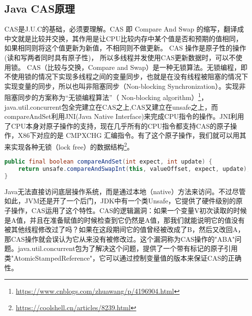 \documentclass[../../../interview-questions.tex]{subfiles}
\begin{document}
\subsection{Java CAS原理}

CAS是J.U.C的基础，必须要理解。CAS 即 Compare And Swap 的缩写，翻译成中文就是比较并交换，其作用是让CPU比较内存中某个值是否和预期的值相同，如果相同则将这个值更新为新值，不相同则不做更新。 CAS 操作是原子性的操作(读和写两者同时具有原子性)， 所以多线程并发使用CAS更新数据时，可以不使用锁。
CAS（比较与交换，Compare and Swap）是一种无锁算法。无锁编程，即不使用锁的情况下实现多线程之间的变量同步，也就是在没有线程被阻塞的情况下实现变量的同步，所以也叫非阻塞同步（Non-blocking Synchronization）。实现非阻塞同步的方案称为“无锁编程算法”（ Non-blocking algorithm）\footnote{\url{https://www.cnblogs.com/zhuawang/p/4196904.html}}，java.util.concurrent包全完建立在CAS之上,CAS又建立在unsafe之上，而compareAndSet利用JNI(Java Native Interface)来完成CPU指令的操作。JNI利用了CPU本身对原子操作的支持，现在几乎所有的CPU指令都支持CAS的原子操作，X86下对应的是 CMPXCHG 汇编指令。有了这个原子操作，我们就可以用其来实现各种无锁（lock free）的数据结构\footnote{\url{https://coolshell.cn/articles/8239.html}}。

\begin{lstlisting}[language=Java]
public final boolean compareAndSet(int expect, int update) {
    return unsafe.compareAndSwapInt(this, valueOffset, expect, update);
}
\end{lstlisting}

Java无法直接访问底层操作系统，而是通过本地（native）方法来访问。不过尽管如此，JVM还是开了一个后门，JDK中有一个类Unsafe，它提供了硬件级别的原子操作，CAS运用了这个特性。CAS的逻辑漏洞：如果一个变量V初次读取的时候是A值，并且在准备赋值的时候检查到它仍然是A值，那我们就能说明它的值没有被其他线程修改过了吗？如果在这段期间它的值曾经被改成了B，然后又改回A，那CAS操作就会误认为它从来没有被修改过。这个漏洞称为CAS操作的"ABA"问题。java.util.concurrent包为了解决这个问题，提供了一个带有标记的原子引用类"AtomicStampedReference"，它可以通过控制变量值的版本来保证CAS的正确性。
\end{document}
